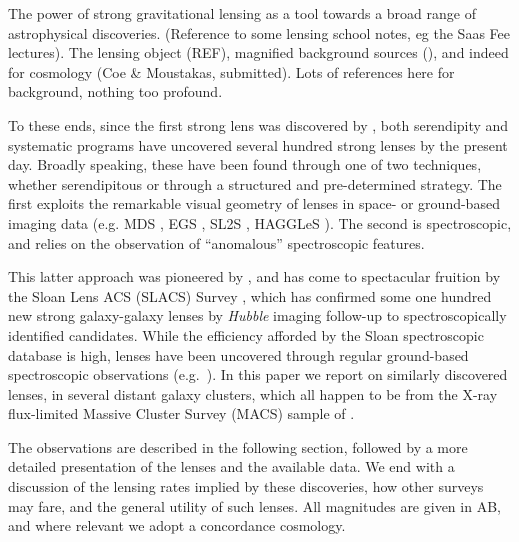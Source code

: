 \documentclass{emulateapj}
\begin{document}
The power of strong gravitational lensing as a tool towards a broad
range of astrophysical discoveries. (Reference to some lensing school
notes, eg the Saas Fee lectures). The lensing object (REF), magnified
background sources (\citealt{bunker:00}), and indeed for cosmology
(Coe \& Moustakas, submitted). Lots of references here for background,
nothing too profound.

To these ends, since the first strong lens was discovered by
\citet{walsh:79}, both serendipity and systematic programs have
uncovered several hundred strong lenses by the present day. Broadly
speaking, these have been found through one of two techniques, whether
serendipitous or through a structured and pre-determined strategy. The
first exploits the remarkable visual geometry of lenses in space- or
ground-based imaging data (e.g. MDS \citet{ratnatunga:99}, EGS
\citet{moustakas:07}, SL2S \citet{cabanac:07}, HAGGLeS
\citet{marshall:09}). The second is spectroscopic, and relies on the
observation of ``anomalous'' spectroscopic features.

This latter approach was pioneered by \citet{warren:96}, and has come
to spectacular fruition by the Sloan Lens ACS (SLACS) Survey
\citep{bolton:08}, which has confirmed some one hundred new strong
galaxy-galaxy lenses by \emph{Hubble} imaging follow-up to
spectroscopically identified candidates.  While the efficiency
afforded by the Sloan spectroscopic database is high, lenses have been
uncovered through regular ground-based spectroscopic observations
(e.g.~\citealt{bolton:06}).  In this paper we report on similarly
discovered lenses, in several distant galaxy clusters, which all
happen to be from the X-ray flux-limited Massive Cluster Survey (MACS)
sample of \citet{ebeling:01}. 

The observations are described in the following section, followed by a
more detailed presentation of the lenses and the available data.  We
end with a discussion of the lensing rates implied by these
discoveries, how other surveys may fare, and the general utility of
such lenses. All magnitudes are given in AB, and where relevant we
adopt a concordance cosmology. 
\end{document}
